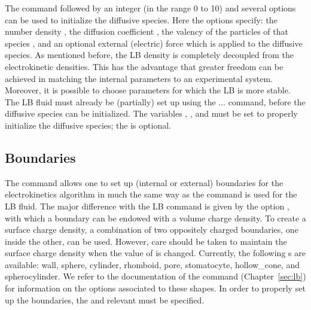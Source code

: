 \begin{essyntax}
  \begin{features}
  \end{features}
\end{essyntax}
The  command followed by an integer 
(in the range 0 to 10) and several options can be used to initialize the 
diffusive species. Here the options specify: the number density
, the diffusion coefficient , the valency of the particles 
of that species , and an optional external (electric) force which
is applied to the diffusive species. As mentioned before, the LB density is 
completely decoupled from the electrokinetic densities. This has the advantage
that greater freedom can be achieved in matching the internal parameters to an
experimental system. Moreover, it is possible to choose parameters for which
the LB is more stable. The LB fluid must already be (partially) set up using the 
  ... command, before the diffusive species can
be initialized. The variables , , and  must be 
set to properly initialize the diffusive species; the  is
optional.

\subsection{\label{ssec:ek-boundaries}Boundaries}

\begin{essyntax}
  \begin{features}
  \end{features}
\end{essyntax}
The  command allows one to set up (internal or external) boundaries
for the electrokinetics algorithm in much the same way as the  
command is used for the LB fluid. The major difference with the LB command is 
given by the option , with which a boundary can be endowed 
with a volume charge density. To create a surface charge density, a combination 
of two oppositely charged boundaries, one inside the other, can be used. 
However, care should be taken to maintain the surface charge density when the
value of  is changed. Currently, the following s are 
available: wall, sphere, cylinder, rhomboid, pore, stomatocyte, hollow_cone, and spherocylinder. We refer to 
the documentation of the  command (Chapter~\ref{sec:lb}) for
information on the options  associated to these shapes. In
order to properly set up the boundaries, the  and relevant
 must be specified.

